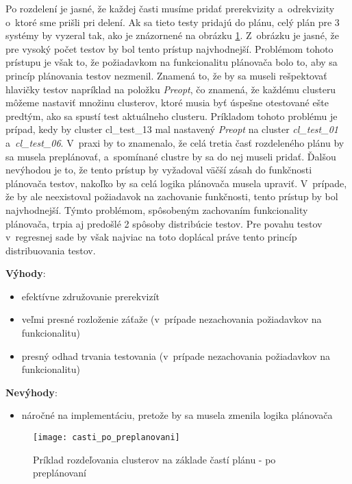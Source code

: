 Po rozdelení je jasné, že každej časti musíme pridať prerekvizity a~odrekvizity
o~ktoré sme prišli pri delení. Ak sa tieto testy pridajú do plánu, celý plán
pre 3 systémy by vyzeral tak, ako je znázornené na obrázku \ref{obrazok:distribucia_casti_po_preplanovani}.
Z~obrázku je jasné, že pre vysoký počet testov by bol tento prístup najvhodnejší.
Problémom tohoto prístupu je však to, že požiadavkom na funkcionalitu plánovača bolo to,
aby sa princíp plánovania testov nezmenil. Znamená to, že by sa museli rešpektovať hlavičky testov
napríklad na položku \emph{Preopt}, čo znamená, že každému clusteru môžeme nastaviť množinu clusterov,
ktoré musia byť úspešne otestované ešte predtým, ako sa spustí test aktuálneho clusteru.
Príkladom tohoto problému je prípad, kedy by cluster cl\_test\_13 mal nastavený 
\emph{Preopt} na cluster \emph{cl\_test\_01} a~\emph{cl\_test\_06}.
V~praxi by to znamenalo, že celá tretia časť rozdeleného plánu by sa musela preplánovať,
a~spomínané clustre by sa do nej museli pridať. Ďalšou nevýhodou je to, že tento prístup by
vyžadoval väčší zásah do funkčnosti plánovača testov, nakoľko by sa celá logika plánovača musela upraviť.
V~prípade, že by ale neexistoval požiadavok na zachovanie funkčnosti, tento prístup by bol najvhodnejší.
Týmto problémom, spôsobeným zachovaním funkcionality plánovača, trpia aj predošlé 2 spôsoby distribúcie testov. 
Pre povahu testov v~regresnej sade by však najviac na toto doplácal práve tento princíp distribuovania testov.  

\noindent \textbf{Výhody}:
\begin{itemize}
\item efektívne združovanie prerekvizít
\item veľmi presné rozloženie záťaže (v~prípade nezachovania požiadavkov na funkcionalitu)
\item presný odhad trvania testovania (v~prípade nezachovania požiadavkov na funkcionalitu)
\end{itemize} 

\noindent \textbf{Nevýhody}:
\begin{itemize}
\item náročné na implementáciu, pretože by sa musela zmenila logika plánovača

\end{itemize}
\begin{figure}[h]
    \begin{center}
    \texttt{[image: casti\_po\_preplanovani]}
	\caption{Príklad rozdeľovania clusterov na základe častí plánu - po preplánovaní}
	\label{obrazok:distribucia_casti_po_preplanovani}
    \end{center}
\end{figure}

